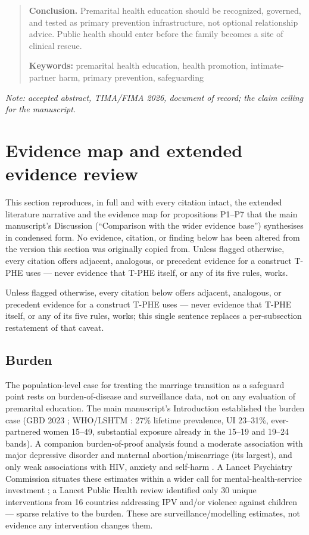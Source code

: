\documentclass[11pt]{article}
\newcommand{\tphe}{T\mbox{-}PHE}
\begin{document}
\begin{quotation}
\textbf{Conclusion.} Premarital health education should be recognized, governed, and tested as primary prevention infrastructure, not optional relationship advice. Public health should enter before the family becomes a site of clinical rescue.

\textbf{Keywords:} premarital health education, health promotion, intimate-partner harm, primary prevention, safeguarding
\end{quotation}

\noindent\textit{Note: accepted abstract, TIMA/FIMA 2026, document of record; the claim ceiling for the manuscript.}

\clearpage
\section{Evidence map and extended evidence review}
\label{sec:S1}
\footnotesize
This section reproduces, in full and with every citation intact, the extended literature narrative and the evidence map for propositions P1--P7 that the main manuscript's Discussion (``Comparison with the wider evidence base'') synthesises in condensed form. No evidence, citation, or finding below has been altered from the version this section was originally copied from. Unless flagged otherwise, every citation offers adjacent, analogous, or precedent evidence for a construct \tphe{} uses --- never evidence that \tphe{} itself, or any of its five rules, works.

Unless flagged otherwise, every citation below offers adjacent, analogous, or precedent evidence for a construct \tphe{} uses --- never evidence that \tphe{} itself, or any of its five rules, works; this single sentence replaces a per-subsection restatement of that caveat.

\subsection{Burden}
The population-level case for treating the marriage transition as a safeguard point rests on burden-of-disease and surveillance data, not on any evaluation of premarital education. The main manuscript's Introduction established the burden case (GBD 2023 \cite{ref1}; WHO/LSHTM \cite{ref2}: 27\% lifetime prevalence, UI 23--31\%, ever-partnered women 15--49, substantial exposure already in the 15--19 and 19--24 bands). A companion burden-of-proof analysis found a moderate association with major depressive disorder and maternal abortion/miscarriage (its largest), and only weak associations with HIV, anxiety and self-harm \cite{ref21}. A Lancet Psychiatry Commission situates these estimates within a wider call for mental-health-service investment \cite{ref22}; a Lancet Public Health review identified only 30 unique interventions from 16 countries addressing IPV and/or violence against children \cite{ref23} --- sparse relative to the burden. These are surveillance/modelling estimates, not evidence any intervention changes them.
\end{document}
